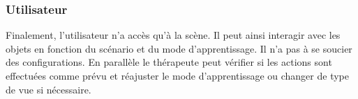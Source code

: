 \subsubsection{Utilisateur}
Finalement, l'utilisateur n'a accès qu'à la scène. Il peut ainsi interagir avec les objets en fonction du scénario et du mode d'apprentissage. Il n'a pas à se soucier des configurations. En parallèle le thérapeute peut vérifier si les actions sont effectuées comme prévu et réajuster le mode d'apprentissage ou changer de type de vue si nécessaire.

